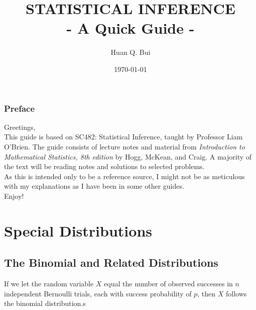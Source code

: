 \documentclass{book}
\theoremstyle{definition}
\begin{document}
	\begin{titlepage}\centering
		\clearpage
		\title{{\textsc{\textbf{STATISTICAL INFERENCE}}}\\ \smallskip - A Quick Guide - \\}
		\author{\bigskip Huan Q. Bui}
		\date{\today}
		\maketitle
		\thispagestyle{empty}
	\end{titlepage}

\subsection*{Preface}

Greetings,\\

This guide is based on SC482: Statistical Inference, taught by Professor Liam O'Brien. The guide consists of lecture notes and material from \textit{Introduction to Mathematical Statistics, 8th edition} by Hogg, McKean, and Craig. A majority of the text will be reading notes and solutions to selected problems. \\

As this is intended only to be a reference source, I might not be as meticulous with my explanations as I have been in some other guides. \\

Enjoy! 

\newpage
\tableofcontents
\newpage




\chapter{Special Distributions}
\newpage


\section{The Binomial and Related Distributions}
If we let the random variable $X$ equal the number of observed successes in $n$ independent Bernoulli trials, each with success probability of $p$, then $X$ follows the binomial distribution.s\\
\end{document}

